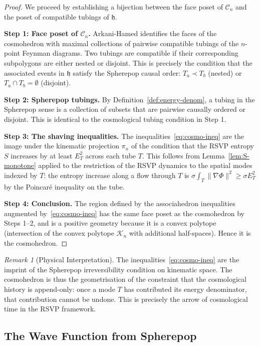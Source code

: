 \documentclass[12pt, oneside]{amsart}
\theoremstyle{plain}
\theoremstyle{definition}
\theoremstyle{remark}
\newtheorem{remark}[theorem]{Remark}
\newcommand{\hist}{\mathfrak{h}}
\newcommand{\Assoc}{\mathcal{K}_n}
\newcommand{\Cosmo}{\mathcal{C}_n}
\begin{document}
\begin{proof}
We proceed by establishing a bijection between the face poset of $\Cosmo$ and the poset of compatible tubings of $\hist$.

\textbf{Step 1: Face poset of $\Cosmo$.} Arkani-Hamed identifies the faces of the cosmohedron with maximal collections of pairwise compatible tubings of the $n$-point Feynman diagrams. Two tubings are compatible if their corresponding subpolygons are either nested or disjoint. This is precisely the condition that the associated events in $\hist$ satisfy the Spherepop causal order: $T_a \prec T_b$ (nested) or $T_a \cap T_b = \emptyset$ (disjoint).

\textbf{Step 2: Spherepop tubings.} By Definition~\ref{def:energy-denom}, a tubing in the Spherepop sense is a collection of subsets that are pairwise causally ordered or disjoint. This is identical to the cosmological tubing condition in Step 1.

\textbf{Step 3: The shaving inequalities.} The inequalities~\eqref{eq:cosmo-ineq} are the image under the kinematic projection $\pi_n$ of the condition that the RSVP entropy $S$ increases by at least $E_T^2$ across each tube $T$. This follows from Lemma~\ref{lem:S-monotone} applied to the restriction of the RSVP dynamics to the spatial modes indexed by $T$: the entropy increase along a flow through $T$ is $\sigma\int_T \|\nabla\Phi\|^2 \geq \sigma E_T^2$ by the Poincaré inequality on the tube.

\textbf{Step 4: Conclusion.} The region defined by the associahedron inequalities augmented by~\eqref{eq:cosmo-ineq} has the same face poset as the cosmohedron by Steps 1--2, and is a positive geometry because it is a convex polytope (intersection of the convex polytope $\Assoc$ with additional half-spaces). Hence it is the cosmohedron.
\end{proof}

\begin{remark}[Physical Interpretation]
The inequalities~\eqref{eq:cosmo-ineq} are the imprint of the Spherepop irreversibility condition on kinematic space. The cosmohedron is thus the geometrisation of the constraint that the cosmological history is append-only: once a mode $T$ has contributed its energy denominator, that contribution cannot be undone. This is precisely the arrow of cosmological time in the RSVP framework.
\end{remark}

\subsection{The Wave Function from Spherepop}
\end{document}

